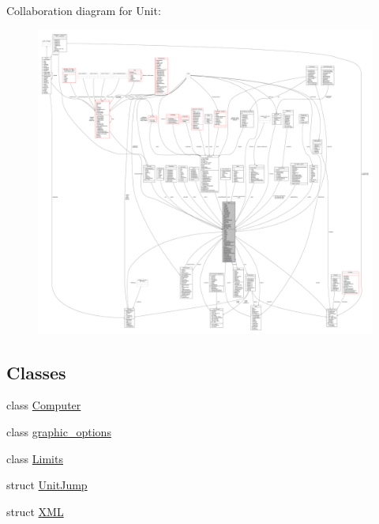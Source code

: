 Collaboration diagram for Unit\+:
\nopagebreak
\begin{figure}[H]
\begin{center}
\leavevmode
\includegraphics[width=350pt]{d5/dc8/classUnit__coll__graph}
\end{center}
\end{figure}
\subsection*{Classes}
\begin{DoxyCompactItemize}
\item 
class \hyperlink{classUnit_1_1Computer}{Computer}
\item 
class \hyperlink{classUnit_1_1graphic__options}{graphic\+\_\+options}
\item 
class \hyperlink{classUnit_1_1Limits}{Limits}
\item 
struct \hyperlink{structUnit_1_1UnitJump}{Unit\+Jump}
\item 
struct \hyperlink{structUnit_1_1XML}{X\+ML}
\end{DoxyCompactItemize}
